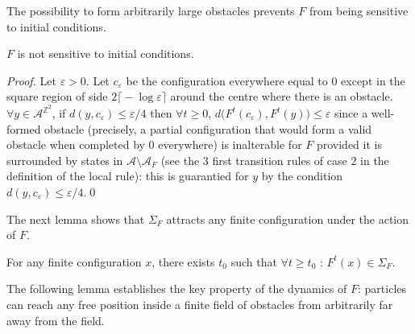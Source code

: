 \documentclass{llncs}
\renewcommand{\epsilon}{\varepsilon}
\newcommand{\A}{\mathcal{A}}
\newcommand{\azz}{\mathcal{A}^{\mathbb{Z}^2}}
\newcommand{\acf}{F}
\newcommand{\obst}{\Sigma_{\acf}}
\newcommand{\obstset}{\A_F}
\begin{document}
The possibility to form arbitrarily large obstacles prevents $\acf$ from
being sensitive to initial conditions.

\begin{proposition}
  \label{prop:nosens}
  $\acf$ is not sensitive to initial conditions.
\end{proposition}
\begin{proof}
  Let ${\epsilon>0}$. Let $c_\epsilon$ be the configuration everywhere
  equal to $0$ except in the square region of side
  ${2\bigl\lceil-\log\epsilon\bigr\rceil}$ around the centre where
  there is an obstacle.  ${\forall y\in\azz}$, if
  ${d(y,c_\epsilon)\leq\epsilon/4}$ then ${\forall t\geq 0}$,
  ${d\bigl(\acf^t(c_\epsilon),\acf^t(y)\bigr)\leq\epsilon}$ since a
  well-formed obstacle (precisely, a partial configuration that would
  form a valid obstacle when completed by $0$ everywhere) is
  inalterable for $\acf$ provided it is surrounded by states in
  $\A\setminus\obstset$ (see the 3 first transition rules of case 2 in
  the definition of the local rule): this is guarantied for $y$ by the
  condition ${d(y,c_\epsilon)\leq\epsilon/4}$.\qed
\end{proof}

The next lemma shows that $\obst$ attracts any finite configuration
under the action of $\acf$.

\begin{lemma}
  \label{lem:finiteattrak}
  For any finite configuration $x$, there exists $t_0$ such that
  ${\forall t\geq t_0}$ : ${\acf^t(x)\in\obst}$.
\end{lemma}

The following lemma establishes the key property of the dynamics of
$\acf$: particles can reach any free position inside a finite field of
obstacles from arbitrarily far away from the field.
\end{document}
